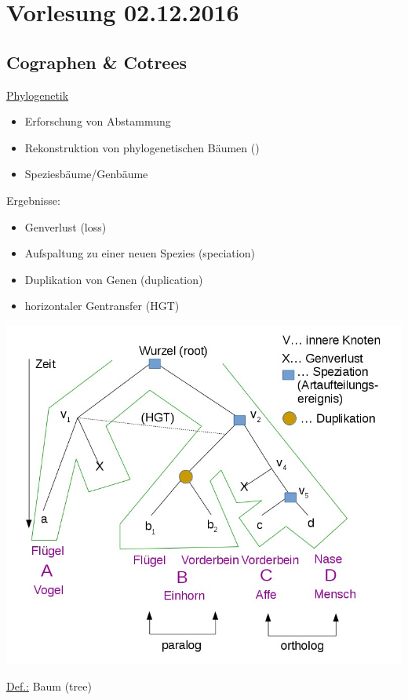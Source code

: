 \section{Vorlesung 02.12.2016}

\subsection{Cographen \& Cotrees}
\underline{Phylogenetik}
\begin{itemize}
    \item Erforschung von Abstammung
    \item Rekonstruktion von phylogenetischen Bäumen (\grqq )
    \item Speziesbäume/Genbäume
\end{itemize}    
Ergebnisse:
\begin{itemize}
    \item Genverlust (loss)
    \item Aufspaltung zu einer neuen Spezies (speciation)
    \item Duplikation von Genen (duplication)
    \item horizontaler Gentransfer (HGT)
\end{itemize}
\begin{center}
\includegraphics[scale=0.5]{lectures/161202/pix/01.jpg}
\end{center}
\par\medskip
\underline{Def.:} Baum (tree)
\newline
